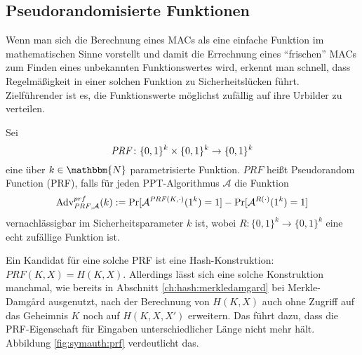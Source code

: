\subsection{Pseudorandomisierte Funktionen}\label{ssec:prf} Wenn man
sich die Berechnung eines MACs als eine einfache Funktion im
mathematischen Sinne vorstellt und damit die Errechnung eines
"`frischen"' MACs zum Finden eines unbekannten Funktionswertes wird,
erkennt man schnell, dass Regelmäßigkeit in einer solchen Funktion zu
Sicherheitslücken führt. Zielführender ist es, die Funktionswerte
möglichst zufällig auf ihre Urbilder zu verteilen.
\begin{definition} Sei  \[\text{\textit{PRF}}\colon\{0,1\}^k \times \{0, 1\}^k \rightarrow
  \{0,1\}^k\] eine über $k \in \mathbbm{N}$ parametrisierte Funktion. $PRF$
  heißt Pseudorandom Function (PRF), falls für jeden PPT-Algorithmus
  $\mathcal{A}$ die Funktion
  \begin{equation*} \text{Adv}_{\text{\textit{PRF}},\mathcal{A}}^{prf}(k)
    := \Pr \lbrack \mathcal{A}^{\text{\textit{PRF}}(K,\cdot)}(1^k) = 1
    \rbrack - \Pr \lbrack \mathcal{A}^{R(\cdot)}(1^k) = 1 \rbrack
  \end{equation*} vernachlässigbar im Sicherheitsparameter $k$ ist, wobei $R: \{0,1\}^k \rightarrow
  \{0,1\}^k$ eine echt zufällige Funktion ist.~\\
\end{definition}

Ein Kandidat für eine solche PRF ist eine Hash-Konstruktion: $PRF(K,X) =
H(K,X)$. Allerdings lässt sich eine solche Konstruktion manchmal, wie
bereits in Abschnitt \ref{ch:hash:merkledamgard} bei Merkle-Damgård
ausgenutzt, nach der Berechnung von $H(K,X)$ auch ohne Zugriff auf das
Geheimnis $K$ noch auf $H(K,X,X')$ erweitern. Das führt dazu, dass die
PRF-Eigenschaft für Eingaben unterschiedlicher Länge nicht mehr
hält. Abbildung \ref{fig:symauth:prf} verdeutlicht das.

